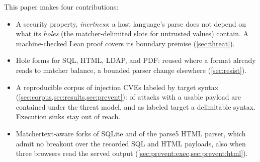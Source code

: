 This paper makes four contributions:
\begin{itemize}
\item A security property, \emph{inertness}: a host language's parse does not
	depend on what its \emph{holes} (the matcher-delimited slots for untrusted
	values) contain. A machine-checked Lean proof covers its boundary premise
	(\cref{sec:threat}).
\item Hole forms for SQL, HTML, LDAP, and PDF: reused where a format already reads
	to matcher balance, a bounded parser change elsewhere (\cref{sec:resist}).
\item A reproducible corpus of \dataInjectionCVEs injection CVEs labeled by
	target syntax (\cref{sec:corpus,sec:results,sec:prevent}):
	\dataContainedShare of attacks with a usable payload are contained under the
	threat model, and \dataHostableShare as labeled target a delimitable syntax.
	Execution sinks stay out of reach.
\item Matchertext-aware forks of SQLite and of the parse5 HTML parser, which
	admit no breakout over the recorded SQL and HTML payloads, also when three
	browsers read the served output (\cref{sec:prevent:exec,sec:prevent:html}).
\end{itemize}
